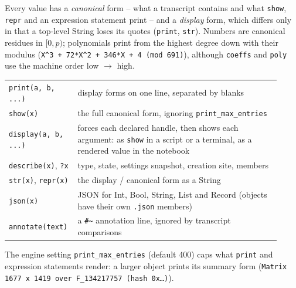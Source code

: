 \documentclass[11pt,openany]{report}
\newcommand{\vb}[1]{\texttt{#1}}
\begin{document}
Every value has a \emph{canonical} form -- what a transcript contains and what \vb{show}, \vb{repr} and an
expression statement print -- and a \emph{display} form, which differs only in that a top-level String
loses its quotes (\vb{print}, \vb{str}). Numbers are canonical residues in $[0,p)$; polynomials print from
the highest degree down with their modulus (\texttt{X\^{}3 + 72*X\^{}2 + 346*X + 4 (mod 691)}), although
\vb{coeffs} and \vb{poly} use the machine order low $\to$ high.
\begin{center}\small
\begin{tabular}{@{}>{\raggedright\arraybackslash}p{0.2\linewidth}>{\raggedright\arraybackslash}p{0.72\linewidth}@{}}
\toprule
\vb{print(a, b, ...)} & display forms on one line, separated by blanks\\
\vb{show(x)} & the full canonical form, ignoring \vb{print\_max\_entries}\\
\vb{display(a, b, ...)} & forces each declared handle, then shows each argument: as \vb{show} in a script or a terminal, as a rendered value in the notebook\\
\vb{describe(x)}, \texttt{?x} & type, state, settings snapshot, creation site, members\\
\vb{str(x)}, \vb{repr(x)} & the display / canonical form as a String\\
\vb{json(x)} & JSON for Int, Bool, String, List and Record (objects have their own \texttt{.json} members)\\
\vb{annotate(text)} & a \texttt{\#\textasciitilde{}} annotation line, ignored by transcript comparisons\\
\bottomrule
\end{tabular}
\end{center}
The engine setting \vb{print\_max\_entries} (default 400) caps what \vb{print} and expression statements
render: a larger object prints its summary form (\texttt{Matrix 1677 x 1419 over F\_134217757 (hash 0x\dots)}).
\end{document}
